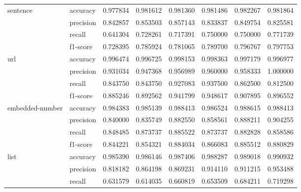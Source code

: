 \begin{tabular}{llrrrrrr}
sentence & accuracy &         0.977834 &         0.981612 &         0.981360 &         0.981486 &         0.982267 &          0.981864 \\
                 & precision &         0.842857 &         0.853503 &         0.857143 &         0.833837 &         0.849754 &          0.825581 \\
                 & recall &         0.641304 &         0.728261 &         0.717391 &         0.750000 &         0.750000 &          0.771739 \\
                 & f1-score &         0.728395 &         0.785924 &         0.781065 &         0.789700 &         0.796767 &          0.797753 \\
url & accuracy &         0.996474 &         0.996725 &         0.998153 &         0.998363 &         0.997179 &          0.996977 \\
                 & precision &         0.931034 &         0.947368 &         0.956989 &         0.960000 &         0.958333 &          1.000000 \\
                 & recall &         0.843750 &         0.843750 &         0.927083 &         0.937500 &         0.862500 &          0.812500 \\
                 & f1-score &         0.885246 &         0.892562 &         0.941799 &         0.948617 &         0.907895 &          0.896552 \\
embedded-number & accuracy &         0.984383 &         0.985139 &         0.988413 &         0.986524 &         0.988615 &          0.988413 \\
                 & precision &         0.840000 &         0.835749 &         0.882550 &         0.858561 &         0.888211 &          0.904255 \\
                 & recall &         0.848485 &         0.873737 &         0.885522 &         0.873737 &         0.882828 &          0.858586 \\
                 & f1-score &         0.844221 &         0.854321 &         0.884034 &         0.866083 &         0.885512 &          0.880829 \\
list & accuracy &         0.985390 &         0.986146 &         0.987406 &         0.988287 &         0.989018 &          0.990932 \\
                 & precision &         0.818182 &         0.864198 &         0.869231 &         0.914110 &         0.911215 &          0.953488 \\
                 & recall &         0.631579 &         0.614035 &         0.660819 &         0.653509 &         0.684211 &          0.719298 \\

\end{tabular}
